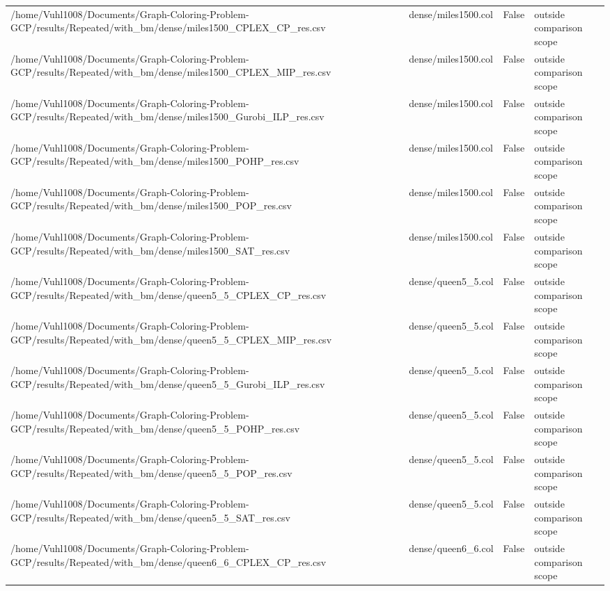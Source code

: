 \begin{table}[htbp]
\begin{tabular}{llll}
/home/Vuhl1008/Documents/Graph-Coloring-Problem-GCP/results/Repeated/with\_bm/dense/miles1500\_CPLEX\_CP\_res.csv & dense/miles1500.col & False & outside comparison scope \\
/home/Vuhl1008/Documents/Graph-Coloring-Problem-GCP/results/Repeated/with\_bm/dense/miles1500\_CPLEX\_MIP\_res.csv & dense/miles1500.col & False & outside comparison scope \\
/home/Vuhl1008/Documents/Graph-Coloring-Problem-GCP/results/Repeated/with\_bm/dense/miles1500\_Gurobi\_ILP\_res.csv & dense/miles1500.col & False & outside comparison scope \\
/home/Vuhl1008/Documents/Graph-Coloring-Problem-GCP/results/Repeated/with\_bm/dense/miles1500\_POHP\_res.csv & dense/miles1500.col & False & outside comparison scope \\
/home/Vuhl1008/Documents/Graph-Coloring-Problem-GCP/results/Repeated/with\_bm/dense/miles1500\_POP\_res.csv & dense/miles1500.col & False & outside comparison scope \\
/home/Vuhl1008/Documents/Graph-Coloring-Problem-GCP/results/Repeated/with\_bm/dense/miles1500\_SAT\_res.csv & dense/miles1500.col & False & outside comparison scope \\
/home/Vuhl1008/Documents/Graph-Coloring-Problem-GCP/results/Repeated/with\_bm/dense/queen5\_5\_CPLEX\_CP\_res.csv & dense/queen5\_5.col & False & outside comparison scope \\
/home/Vuhl1008/Documents/Graph-Coloring-Problem-GCP/results/Repeated/with\_bm/dense/queen5\_5\_CPLEX\_MIP\_res.csv & dense/queen5\_5.col & False & outside comparison scope \\
/home/Vuhl1008/Documents/Graph-Coloring-Problem-GCP/results/Repeated/with\_bm/dense/queen5\_5\_Gurobi\_ILP\_res.csv & dense/queen5\_5.col & False & outside comparison scope \\
/home/Vuhl1008/Documents/Graph-Coloring-Problem-GCP/results/Repeated/with\_bm/dense/queen5\_5\_POHP\_res.csv & dense/queen5\_5.col & False & outside comparison scope \\
/home/Vuhl1008/Documents/Graph-Coloring-Problem-GCP/results/Repeated/with\_bm/dense/queen5\_5\_POP\_res.csv & dense/queen5\_5.col & False & outside comparison scope \\
/home/Vuhl1008/Documents/Graph-Coloring-Problem-GCP/results/Repeated/with\_bm/dense/queen5\_5\_SAT\_res.csv & dense/queen5\_5.col & False & outside comparison scope \\
/home/Vuhl1008/Documents/Graph-Coloring-Problem-GCP/results/Repeated/with\_bm/dense/queen6\_6\_CPLEX\_CP\_res.csv & dense/queen6\_6.col & False & outside comparison scope \\

\end{tabular}
\end{table}
